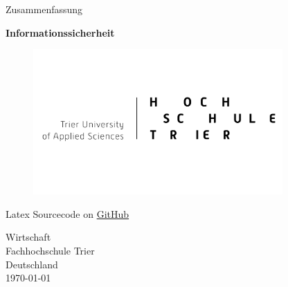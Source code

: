 \begin{titlepage}
  \begin{center}
    \begin{large}
        Zusammenfassung
    \end{large}
    
    \begin{huge}
        \begin{singlespace}
            \textbf{Informationssicherheit}
        \end{singlespace}
    \end{huge}

    \vspace{0.5cm}

	\begin{figure}[h]
		\centering
		\includegraphics[width=0.85\textwidth]{images//logo.png}
		\label{img:fh-trier-logo}
	\end{figure}
	
    \vspace{2.5cm}
    
    Latex Sourcecode on \href{https://github.com}{GitHub}
    
    \vspace{2.5cm}
    
    Wirtschaft\\
    Fachhochschule Trier\\
    Deutschland\\
    \today{}
    
  \end{center}
\end{titlepage}
